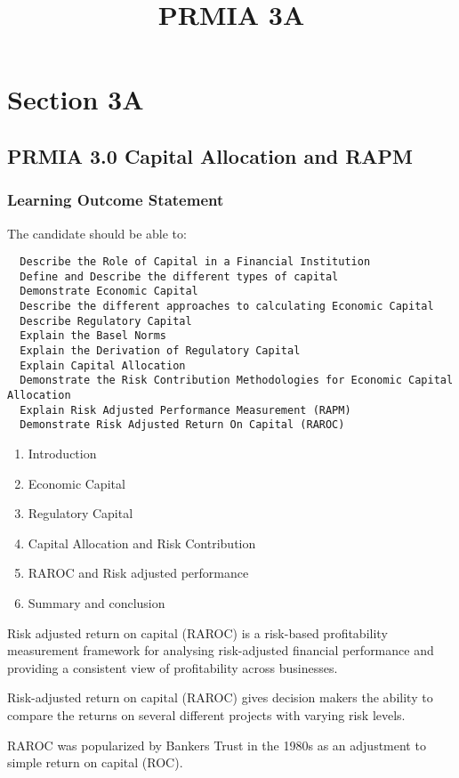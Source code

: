 \documentclass[]{report}
\title{PRMIA 3A}
\begin{document}
\maketitle

\section{Section 3A}
\subsection{PRMIA 3.0 Capital Allocation and RAPM}

\subsubsection{Learning Outcome Statement}
The candidate should be able to:
\begin{verbatim}
  Describe the Role of Capital in a Financial Institution
  Define and Describe the different types of capital
  Demonstrate Economic Capital
  Describe the different approaches to calculating Economic Capital
  Describe Regulatory Capital
  Explain the Basel Norms
  Explain the Derivation of Regulatory Capital
  Explain Capital Allocation
  Demonstrate the Risk Contribution Methodologies for Economic Capital Allocation
  Explain Risk Adjusted Performance Measurement (RAPM)
  Demonstrate Risk Adjusted Return On Capital (RAROC)
\end{verbatim}

\begin{enumerate}
\item Introduction
\item Economic Capital
\item Regulatory Capital
\item Capital Allocation and Risk Contribution
\item RAROC and Risk adjusted performance
\item Summary and conclusion
\end{enumerate}

Risk adjusted return on capital (RAROC) is a risk-based profitability measurement framework for analysing risk-adjusted financial performance and providing a consistent view of profitability across businesses. 

Risk-adjusted return on capital (RAROC) gives decision makers the ability to compare the returns on several different projects with varying risk levels.

RAROC was popularized by Bankers Trust in the 1980s as an adjustment to simple return on capital (ROC).
\end{document}
